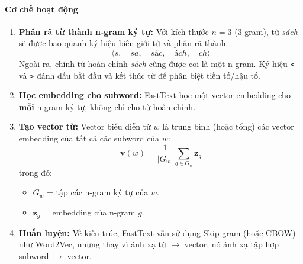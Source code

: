 \paragraph{Cơ chế hoạt động}
\begin{enumerate}
    \item \textbf{Phân rã từ thành n-gram ký tự:}  
    Với kích thước $n=3$ (3-gram), từ \textit{sách} sẽ được bao quanh ký hiệu biên giới từ và phân rã thành:
    \[
    \langle s, \quad sa, \quad sác, \quad ách, \quad ch\rangle
    \]
    Ngoài ra, chính từ hoàn chỉnh \textit{sách} cũng được coi là một n-gram.  
    Ký hiệu \verb|<| và \verb|>| đánh dấu bắt đầu và kết thúc từ để phân biệt tiền tố/hậu tố.

    \item \textbf{Học embedding cho subword:}  
    FastText học một vector embedding cho \textbf{mỗi} n-gram ký tự, không chỉ cho từ hoàn chỉnh.

    \item \textbf{Tạo vector từ:}  
    Vector biểu diễn từ $w$ là trung bình (hoặc tổng) các vector embedding của tất cả các subword của $w$:
    \[
    \mathbf{v}(w) = \frac{1}{|G_w|} \sum_{g \in G_w} \mathbf{z}_g
    \]
    trong đó:
    \begin{itemize}
        \item $G_w$ = tập các n-gram ký tự của $w$.
        \item $\mathbf{z}_g$ = embedding của n-gram $g$.
    \end{itemize}

    \item \textbf{Huấn luyện:}  
    Về kiến trúc, FastText vẫn sử dụng Skip-gram (hoặc CBOW) như Word2Vec, nhưng thay vì ánh xạ từ $\rightarrow$ vector, nó ánh xạ tập hợp subword $\rightarrow$ vector.
\end{enumerate}

